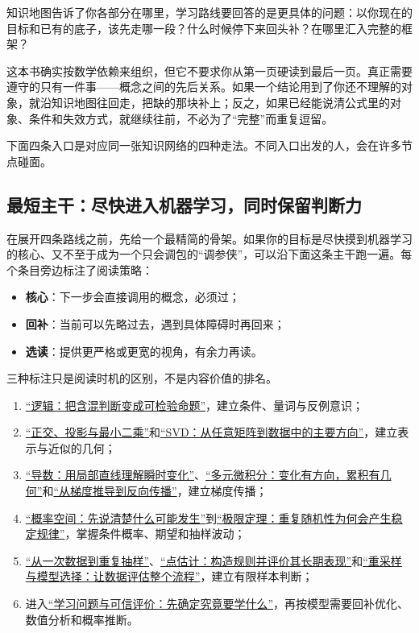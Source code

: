 知识地图告诉了你各部分在哪里，学习路线要回答的是更具体的问题：以你现在的目标和已有的底子，该先走哪一段？什么时候停下来回头补？在哪里汇入完整的框架？

这本书确实按数学依赖来组织，但它不要求你从第一页硬读到最后一页。真正需要遵守的只有一件事——概念之间的先后关系。如果一个结论用到了你还不理解的对象，就沿知识地图往回走，把缺的那块补上；反之，如果已经能说清公式里的对象、条件和失效方式，就继续往前，不必为了``完整''而重复逗留。

下面四条入口是对应同一张知识网络的四种走法。不同入口出发的人，会在许多节点碰面。

\subsection{最短主干：尽快进入机器学习，同时保留判断力}

在展开四条路线之前，先给一个最精简的骨架。如果你的目标是尽快摸到机器学习的核心、又不至于成为一个只会调包的``调参侠''，可以沿下面这条主干跑一遍。每个条目旁边标注了阅读策略：

\begin{itemize}
\tightlist
\item \textbf{核心}：下一步会直接调用的概念，必须过；
\item \textbf{回补}：当前可以先略过去，遇到具体障碍时再回来；
\item \textbf{选读}：提供更严格或更宽的视角，有余力再读。
\end{itemize}

三种标注只是阅读时机的区别，不是内容价值的排名。

\begin{enumerate}
\tightlist
\item \hyperref[ch:005]{``逻辑：把含混判断变成可检验命题''}，建立条件、量词与反例意识；
\item \hyperref[ch:019]{``正交、投影与最小二乘''}和\hyperref[ch:023]{``SVD：从任意矩阵到数据中的主要方向''}，建立表示与近似的几何；
\item \hyperref[ch:012]{``导数：用局部直线理解瞬时变化''}、\hyperref[ch:015]{``多元微积分：变化有方向，累积有几何''}和\hyperref[ch:084]{``从梯度推导到反向传播''}，建立梯度传播；
\item \hyperref[ch:037]{``概率空间：先说清楚什么可能发生''}到\hyperref[ch:044]{``极限定理：重复随机性为何会产生稳定规律''}，掌握条件概率、期望和抽样波动；
\item \hyperref[ch:086]{``从一次数据到重复抽样''}、\hyperref[ch:087]{``点估计：构造规则并评价其长期表现''}和\hyperref[ch:091]{``重采样与模型选择：让数据评估整个流程''}，建立有限样本判断；
\item 进入\hyperref[ch:109]{``学习问题与可信评价：先确定究竟要学什么''}，再按模型需要回补优化、数值分析和概率推断。
\end{enumerate}


